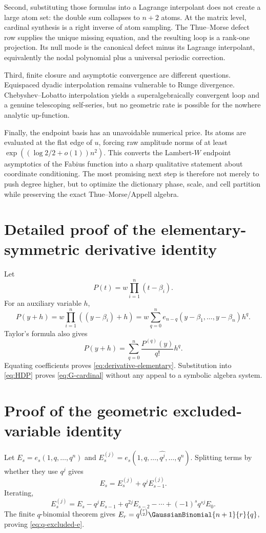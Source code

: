 \documentclass[11pt,oneside]{article}
\theoremstyle{definition}
\theoremstyle{remark}
\newcommand{\1}{\mathbf{1}}
\begin{document}
Second, substituting those formulas into a Lagrange interpolant does not
create a large atom set: the double sum collapses to $n+2$ atoms.  At the
matrix level, cardinal synthesis is a right inverse of atom sampling.  The
Thue--Morse defect row supplies the unique missing equation, and the resulting
loop is a rank-one projection.  Its null mode is the canonical defect minus
its Lagrange interpolant, equivalently the nodal polynomial plus a universal
periodic correction.

Third, finite closure and asymptotic convergence are different questions.
Equispaced dyadic interpolation remains vulnerable to Runge divergence.
Chebyshev--Lobatto interpolation yields a superalgebraically convergent loop
and a genuine telescoping self-series, but no geometric rate is possible for
the nowhere analytic up-function.

Finally, the endpoint basis has an unavoidable numerical price.  Its atoms
are evaluated at the flat edge of $u$, forcing raw amplitude norms of at least
$\exp((\log2/2+o(1))n^2)$.  This converts the Lambert-$W$ endpoint asymptotics
of the Fabius function into a sharp qualitative statement about coordinate
conditioning.  The most promising next step is therefore not merely to push
degree higher, but to optimize the dictionary phase, scale, and cell
partition while preserving the exact Thue--Morse/Appell algebra.

\appendix

\section{Detailed proof of the elementary-symmetric derivative identity}

Let
\[
 P(t)=w\prod_{i=1}^n(t-\beta_i).
\]
For an auxiliary variable $h$,
\[
 P(y+h)=w\prod_{i=1}^n((y-\beta_i)+h)
 =w\sum_{q=0}^n e_{n-q}(y-\beta_1,\ldots,y-\beta_n)h^q.
\]
Taylor's formula also gives
\[
 P(y+h)=\sum_{q=0}^n\frac{P^{(q)}(y)}{q!}h^q.
\]
Equating coefficients proves \eqref{eq:derivative-elementary}.  Substitution
into \eqref{eq:HDP} proves \eqref{eq:G-cardinal} without any appeal to a
symbolic algebra system.

\section{Proof of the geometric excluded-variable identity}

Let $E_s=e_s(1,q,\ldots,q^n)$ and
$E_s^{(j)}=e_s(1,q,\ldots,\widehat{q^j},\ldots,q^n)$.  Splitting terms by
whether they use $q^j$ gives
\[
 E_s=E_s^{(j)}+q^jE_{s-1}^{(j)}.
\]
Iterating,
\[
 E_s^{(j)}=E_s-q^jE_{s-1}+q^{2j}E_{s-2}-\cdots+(-1)^sq^{sj}E_0.
\]
The finite $q$-binomial theorem gives
$E_r=q^{\binom r2}\GaussianBinomial{n+1}{r}{q}$, proving
\eqref{eq:q-excluded-e}.
\end{document}
